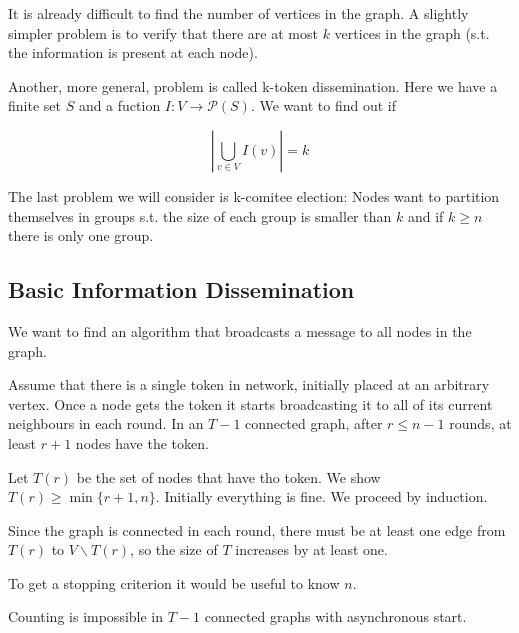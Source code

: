 It is already difficult to find the number of vertices in the graph. A slightly simpler problem is to verify that there are at most $k$ vertices in the graph (s.t. the information is present at each node).

Another, more general, problem is called k-token dissemination. Here we have a finite set $S$ and a fuction $I:V\rightarrow \mathcal{P}(S)$. We want to find out if 

\[|\bigcup_{v\in V} I(v)| = k\]

The last problem we will consider is k-comitee election: Nodes want to partition themselves in groups s.t. the size of each group is smaller than $k$ and  if $k\geq n$ there is only one group.

\subsection{Basic Information Dissemination}

We want to find an algorithm that broadcasts a message to all nodes in the graph.

\begin{thm} Assume that there is a single token in network, initially placed at an arbitrary vertex. Once a node gets the token it starts broadcasting it to all of its current neighbours in each round. In an $T-1$ connected graph, after $r\leq n-1$ rounds, at least $r+1$ nodes have the token.\end{thm}

\begin{pr} Let $T(r)$ be the set of nodes that have tho token. We show $T(r) \geq \min\{r+1,n\}$. Initially everything is fine. We proceed by induction.

Since the graph is connected in each round, there must be at least one edge from $T(r)$ to $V\backslash T(r)$, so the size of $T$ increases by at least one.
\end{pr}

To get a stopping criterion it would be useful to know $n$.

\begin{thm} Counting is impossible in $T-1$ connected graphs with asynchronous start.
\end{thm}